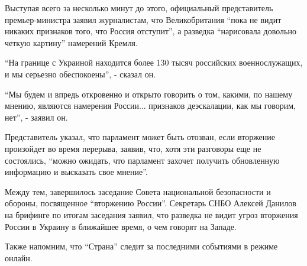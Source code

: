 Выступая всего за несколько минут до этого, официальный представитель
премьер-министра заявил журналистам, что Великобритания \enquote{пока не видит
никаких признаков того, что Россия отступит}, а разведка \enquote{нарисовала
довольно четкую картину} намерений Кремля.

\enquote{На границе с Украиной находится более 130 тысяч российских
военнослужащих, и мы серьезно обеспокоены}, - сказал он.

\enquote{Мы будем и впредь откровенно и открыто говорить о том, какими, по
нашему мнению, являются намерения России... признаков деэскалации, как мы
говорим, нет}, - заявил он.

Представитель указал, что парламент может быть отозван, если вторжение
произойдет во время перерыва, заявив, что, хотя эти разговоры еще не
состоялись, \enquote{можно ожидать, что парламент захочет получить обновленную
информацию и высказать свое мнение}.

Между тем, завершилось заседание Совета национальной безопасности и обороны,
посвященное \enquote{вторжению России}. Секретарь СНБО Алексей Данилов на брифинге по
итогам заседания заявил, что разведка не видит угроз вторжения России в Украину
в ближайшее время, о чем говорят на Западе.

Также напомним, что \enquote{Страна} следит за последними событиями в режиме онлайн.
